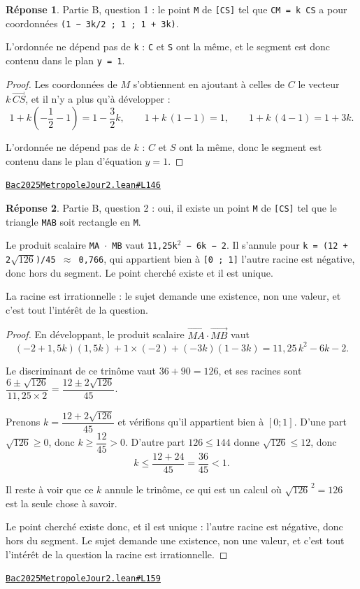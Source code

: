 \documentclass[11pt,a4paper]{article}
\theoremstyle{definition}
\theoremstyle{plain}
\theoremstyle{definition}
\newtheorem*{reponse}{Réponse}
\newcommand{\source}[2]{\par\smallskip\noindent\hfill{\footnotesize\href{#1}{\texttt{#2}}}\par\smallskip}
\begin{document}
\begin{reponse}
Partie B, question 1 : le point \texttt{M} de \texttt{[CS]} tel que \texttt{CM = k CS} a pour
coordonnées \texttt{(1 − 3k/2 ; 1 ; 1 + 3k)}.

L'ordonnée ne dépend pas de \texttt{k} : \texttt{C} et \texttt{S} ont la même, et le segment est donc
contenu dans le plan \texttt{y = 1}.
\end{reponse}
\begin{proof}
Les coordonnées de $M$ s'obtiennent en ajoutant à celles de $C$ le vecteur
$k\,\vec{CS}$, et il n'y a plus qu'à développer :
\[ 1 + k\left(-\frac{1}{2} - 1\right) = 1 - \frac{3}{2}k , \qquad
   1 + k\,(1 - 1) = 1 , \qquad
   1 + k\,(4 - 1) = 1 + 3k . \]

L'ordonnée ne dépend pas de $k$ : $C$ et $S$ ont la même, donc le segment est contenu dans
le plan d'équation $y = 1$.
\end{proof}
\source{https://github.com/Commutator-IO/learn-lean/blob/main/exams/2025/Bac2025MetropoleJour2.lean\#L146}{Bac2025MetropoleJour2.lean\#L146}

\begin{reponse}
Partie B, question 2 : oui, il existe un point \texttt{M} de \texttt{[CS]} tel que le triangle
\texttt{MAB} soit rectangle en \texttt{M}.

Le produit scalaire \texttt{MA \(\cdot\) MB} vaut \texttt{11,25k\(^{2}\) − 6k − 2}. Il s'annule pour
\texttt{k = (12 + 2\(\sqrt{126}\))/45 \(\approx\) 0,766}, qui appartient bien à \texttt{[0 ; 1]} \textemdash{} l'autre racine est
négative, donc hors du segment. Le point cherché existe et il est unique.

La racine est irrationnelle : le sujet demande une existence, non une valeur, et c'est
tout l'intérêt de la question.
\end{reponse}
\begin{proof}
En développant, le produit scalaire $\vec{MA} \cdot \vec{MB}$ vaut
\[ (-2 + 1{,}5k)(1{,}5k) + 1 \times (-2) + (-3k)(1 - 3k) = 11{,}25\,k^2 - 6k - 2 . \]

Le discriminant de ce trinôme vaut $36 + 90 = 126$, et ses racines sont
$\dfrac{6 \pm \sqrt{126}}{11{,}25 \times 2} = \dfrac{12 \pm 2\sqrt{126}}{45}$.

Prenons $k = \dfrac{12 + 2\sqrt{126}}{45}$ et vérifions qu'il appartient bien à
$[0 ; 1]$. D'une part $\sqrt{126} \ge 0$, donc $k \ge \dfrac{12}{45} > 0$. D'autre part
$126 \le 144$ donne $\sqrt{126} \le 12$, donc
\[ k \le \frac{12 + 24}{45} = \frac{36}{45} < 1 . \]

Il reste à voir que ce $k$ annule le trinôme, ce qui est un calcul où
$\sqrt{126}^{\,2} = 126$ est la seule chose à savoir.

Le point cherché existe donc, et il est unique : l'autre racine est négative, donc hors du
segment. Le sujet demande une existence, non une valeur, et c'est tout l'intérêt de la
question \textemdash{} la racine est irrationnelle.
\end{proof}
\source{https://github.com/Commutator-IO/learn-lean/blob/main/exams/2025/Bac2025MetropoleJour2.lean\#L159}{Bac2025MetropoleJour2.lean\#L159}
\end{document}
